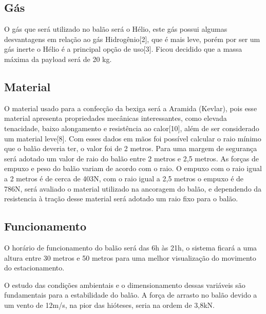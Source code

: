   \subsection{Gás}
    O gás que será utilizado no balão será o Hélio, este gás possui algumas desvantagens em relação ao gás Hidrogênio[2], que é mais leve, porém por ser um gás inerte o Hélio é a principal opção  de uso[3]. Ficou decidido que a massa  máxima  da payload será de 20 kg.

  \subsection{Material}
    O material usado para a confecção da bexiga será a Aramida (Kevlar), pois  esse material apresenta propriedades mecânicas interessantes, como elevada tenacidade, baixo alongamento e resistência ao calor[10],  além de ser considerado um material leve[8]. Com esses dados em mãos foi possível calcular o raio mínimo que o balão deveria ter, o valor foi de 2 metros. Para uma margem de segurança será adotado um valor de raio do balão entre 2 metros e 2,5 metros. As forças de empuxo e peso do balão variam de acordo com o raio. O empuxo com o raio igual a 2 metros é de cerca de 403N, com o raio igual a 2,5 metros o empuxo é de 786N, será avaliado o material utilizado na ancoragem do balão,  e dependendo da resistencia à tração desse material será adotado um raio fixo para o balão.

  \subsection{Funcionamento}
    O horário de funcionamento do balão será das 6h às 21h, o sistema ficará a uma altura entre 30 metros e 50 metros para uma melhor visualização do movimento do estacionamento.

    O estudo das condições ambientais e o dimensionamento dessas variáveis são fundamentais para a estabilidade do balão. A força de arrasto no balão devido a um vento de 12m/s, na pior das hióteses, seria na ordem de 3,8kN.

  
